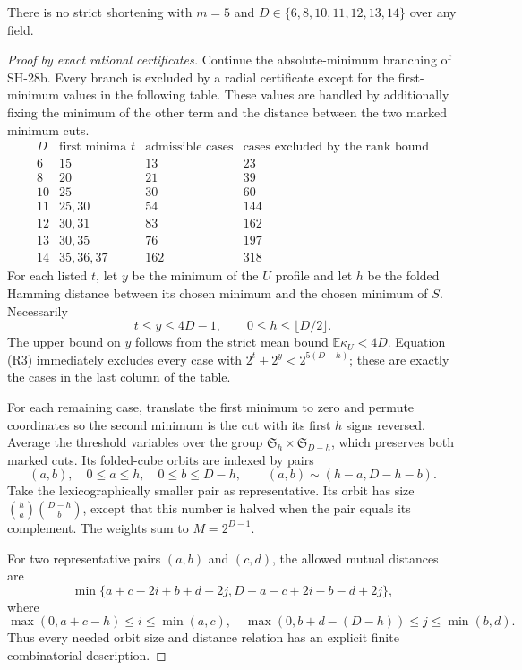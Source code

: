 \begin{proposition}
\label{prop:width-five-two-minima}
There is no strict shortening with $m=5$ and
$D\in\{6,8,10,11,12,13,14\}$ over any field.
\end{proposition}
\begin{proof}[Proof by exact rational certificates]
Continue the absolute-minimum branching of SH-28b.
Every branch is excluded by a radial certificate except
for the first-minimum values in the following table.
These values are handled by additionally fixing the
minimum of the other term and the distance between
the two marked minimum cuts.
\[
\begin{array}{c|l|r|r}
 D&\text{first minima }t&\text{admissible cases}&
 \text{cases excluded by the rank bound}\\\hline
 6&15&13&23\\
 8&20&21&39\\
 10&25&30&60\\
 11&25,30&54&144\\
 12&30,31&83&162\\
 13&30,35&76&197\\
 14&35,36,37&162&318
\end{array}
\]
For each listed $t$, let $y$ be the minimum of the
$U$ profile and let $h$ be the folded Hamming distance
between its chosen minimum and the chosen minimum
of $S$.  Necessarily
\[
 t\le y\le4D-1,\qquad0\le h\le\lfloor D/2\rfloor.
 \tag{R14}
\]
The upper bound on $y$ follows from the strict mean
bound $\mathbb E\kappa_U<4D$.
Equation (R3) immediately excludes every case with
$2^t+2^y<2^{5(D-h)}$; these are exactly the cases
in the last column of the table.

For each remaining case, translate the first minimum
to zero and permute coordinates so the second minimum
is the cut with its first $h$ signs reversed.
Average the threshold variables over the group
$\mathfrak S_h\times\mathfrak S_{D-h}$, which preserves
both marked cuts.  Its folded-cube orbits are indexed
by pairs
\[
 (a,b),\quad0\le a\le h,\quad0\le b\le D-h,
 \qquad(a,b)\sim(h-a,D-h-b).
\]
Take the lexicographically smaller pair as representative.
Its orbit has size
$\binom ha\binom{D-h}b$, except that this number is
halved when the pair equals its complement.
The weights sum to $M=2^{D-1}$.

For two representative pairs $(a,b)$ and $(c,d)$,
the allowed mutual distances are
\[
 \min\{a+c-2i+b+d-2j,
 D-a-c+2i-b-d+2j\},                               \tag{R15}
\]
where
\[
 \max(0,a+c-h)\le i\le\min(a,c),\quad
 \max(0,b+d-(D-h))\le j\le\min(b,d).
\]
Thus every needed orbit size and distance relation has
an explicit finite combinatorial description.


\end{proof}
